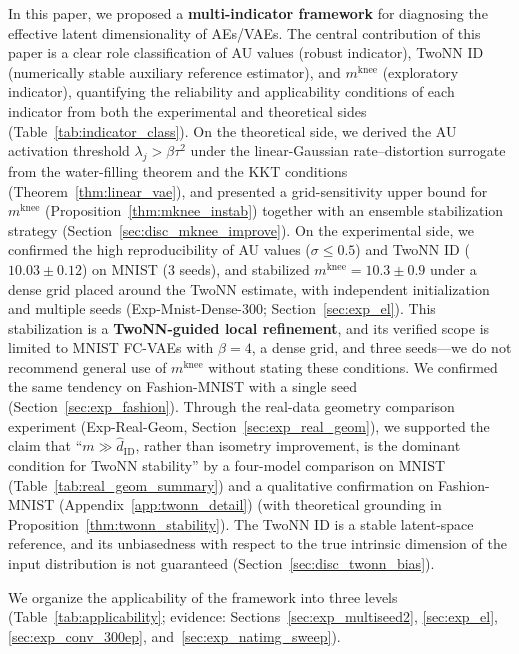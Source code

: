 \documentclass[make,article,submit,pdftex,moreauthors]{Definitions/mdpi}
\newcommand{\mknee}{m^{\mathrm{knee}}}
\begin{document}
In this paper, we proposed a \textbf{multi-indicator framework} for diagnosing
the effective latent dimensionality of AEs/VAEs.
The central contribution of this paper is a clear role classification of AU
values (robust indicator), TwoNN ID (numerically stable auxiliary reference
estimator), and $\mknee$ (exploratory indicator), quantifying the reliability
and applicability conditions of each indicator from both the experimental and
theoretical sides (Table~\ref{tab:indicator_class}).
On the theoretical side, we derived the AU activation threshold
$\lambda_j > \beta\tau^2$ under the linear-Gaussian rate--distortion surrogate
from the water-filling theorem and the KKT conditions
(Theorem~\ref{thm:linear_vae}), and presented a grid-sensitivity upper bound
for $\mknee$ (Proposition~\ref{thm:mknee_instab}) together with an ensemble
stabilization strategy (Section~\ref{sec:disc_mknee_improve}).
On the experimental side, we confirmed the high reproducibility of AU values
($\sigma \leq 0.5$) and TwoNN ID ($10.03 \pm 0.12$) on MNIST (3 seeds), and
stabilized $\mknee = 10.3 \pm 0.9$ under a dense grid placed around the TwoNN
estimate, with independent initialization and multiple seeds
(Exp-Mnist-Dense-300; Section~\ref{sec:exp_el}).
This stabilization is a \textbf{TwoNN-guided local refinement}, and its
verified scope is limited to MNIST FC-VAEs with $\beta = 4$, a dense grid, and
three seeds---we do not recommend general use of $\mknee$ without stating
these conditions.
We confirmed the same tendency on Fashion-MNIST with a single seed
(Section~\ref{sec:exp_fashion}).
Through the real-data geometry comparison experiment
(Exp-Real-Geom, Section~\ref{sec:exp_real_geom}), we supported the claim that
``$m \gg \hat{d}_\mathrm{ID}$, rather than isometry improvement, is the
dominant condition for TwoNN stability'' by a four-model comparison on MNIST
(Table~\ref{tab:real_geom_summary}) and a qualitative confirmation on
Fashion-MNIST (Appendix~\ref{app:twonn_detail})
(with theoretical grounding in Proposition~\ref{thm:twonn_stability}).
The TwoNN ID is a stable latent-space reference, and its unbiasedness with
respect to the true intrinsic dimension of the input distribution is not
guaranteed (Section~\ref{sec:disc_twonn_bias}).

We organize the applicability of the framework into three levels
(Table~\ref{tab:applicability};
evidence: Sections~\ref{sec:exp_multiseed2}, \ref{sec:exp_el},
\ref{sec:exp_conv_300ep}, and~\ref{sec:exp_natimg_sweep}).
\end{document}
